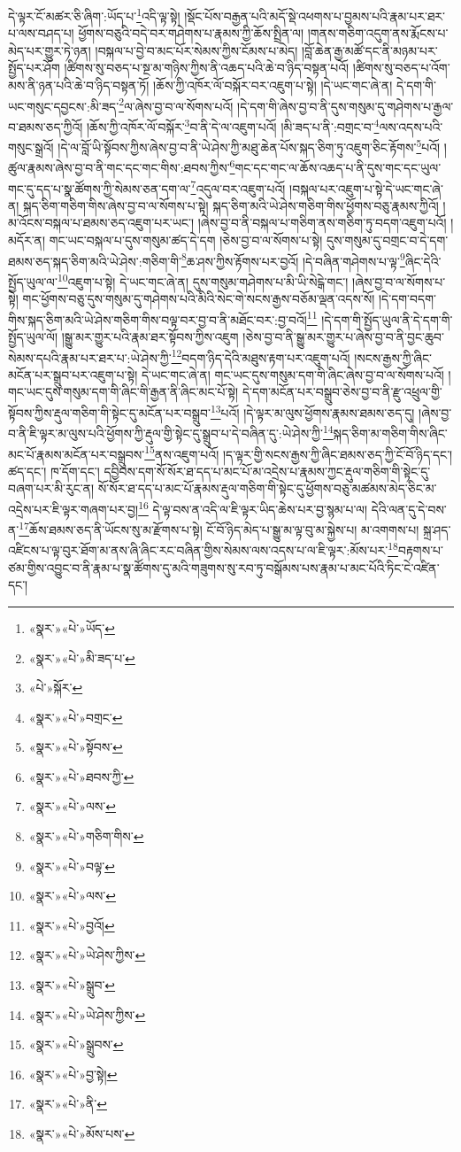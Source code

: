 དེ་ལྟར་ངོ་མཚར་ཅི་ཞིག་:ཡོད་པ་\footnote{«སྣར་»«པེ་»ཡོད་}འདི་ལྟ་སྟེ། །སྡོང་པོས་བརྒྱན་པའི་མདོ་སྡེ་འཕགས་པ་བྱམས་པའི་རྣམ་པར་ཐར་པ་ལས་བཤད་པ། ཕྱོགས་བཅུའི་བདེ་བར་གཤེགས་པ་རྣམས་ཀྱི་ཆོས་སྤྲིན་ལ། །གནས་གཅིག་འདུག་ནས་རྨོངས་པ་མེད་པར་གྱུར་ཏེ་ཉན། །བསྐལ་པ་བྱེ་བ་མང་པོར་སེམས་ཀྱིས་ངོམས་པ་མེད། །བློ་ཆེན་རྒྱ་མཚོ་དང་ནི་མཉམ་པར་སྤྱོད་པར་ཤོག །ཚིགས་སུ་བཅད་པ་སྔ་མ་གཉིས་ཀྱིས་ནི་འཆད་པའི་ཆེ་བ་ཉིད་བསྟན་པའོ། །ཚིགས་སུ་བཅད་པ་འོག་མས་ནི་ཉན་པའི་ཆེ་བ་ཉིད་བསྟན་ཏོ། །ཆོས་ཀྱི་འཁོར་ལོ་བསྐོར་བར་འཇུག་པ་སྟེ། །དེ་ཡང་གང་ཞེ་ན། དེ་དག་གི་ཡང་གསུང་དབྱངས་:མི་ཟད་\footnote{«སྣར་»«པེ་»མི་ཟད་པ་}ལ་ཞེས་བྱ་བ་ལ་སོགས་པའོ། །དེ་དག་གི་ཞེས་བྱ་བ་ནི་དུས་གསུམ་དུ་གཤེགས་པ་རྒྱལ་བ་ཐམས་ཅད་ཀྱིའོ། །ཆོས་ཀྱི་འཁོར་ལོ་བསྐོར་\footnote{«པེ་»སྐོར་}བ་ནི་དེ་ལ་འཇུག་པའོ། །མི་ཟད་པ་ནི་:བགྲང་བ་\footnote{«སྣར་»«པེ་»བགྲང་}ལས་འདས་པའི་གསུང་སྒྲའོ། །དེ་ལ་བློ་ཡི་སྟོབས་ཀྱིས་ཞེས་བྱ་བ་ནི་ཡེ་ཤེས་ཀྱི་མཐུ་ཆེན་པོས་སྐད་ཅིག་ཏུ་འཇུག་ཅིང་རྟོགས་\footnote{«སྣར་»«པེ་»སྟོབས་}པའོ། །ཚུལ་རྣམས་ཞེས་བྱ་བ་ནི་གང་དང་གང་གིས་:ཐབས་ཀྱིས་\footnote{«སྣར་»«པེ་»ཐབས་ཀྱི་}གང་དང་གང་ལ་ཆོས་འཆད་པ་ནི་དུས་གང་དང་ཡུལ་གང་དུ་དད་པ་སྣ་ཚོགས་ཀྱི་སེམས་ཅན་དག་ལ་\footnote{«སྣར་»«པེ་»ལས་}འདུལ་བར་འཇུག་པའོ། །བསྐལ་པར་འཇུག་པ་སྟེ་དེ་ཡང་གང་ཞེ་ན། སྐད་ཅིག་གཅིག་གིས་ཞེས་བྱ་བ་ལ་སོགས་པ་སྟེ། སྐད་ཅིག་མའི་ཡེ་ཤེས་གཅིག་གིས་ཕྱོགས་བཅུ་རྣམས་ཀྱིའོ། །མ་འོངས་བསྐལ་པ་ཐམས་ཅད་འཇུག་པར་ཡང་། །ཞེས་བྱ་བ་ནི་བསྐལ་པ་གཅིག་ནས་གཅིག་ཏུ་བདག་འཇུག་པའོ། །མདོར་ན། གང་ཡང་བསྐལ་པ་དུས་གསུམ་ཚད་དེ་དག །ཅེས་བྱ་བ་ལ་སོགས་པ་སྟེ། དུས་གསུམ་དུ་བགྲང་བ་དེ་དག་ཐམས་ཅད་སྐད་ཅིག་མའི་ཡེ་ཤེས་:གཅིག་གི་\footnote{«སྣར་»«པེ་»གཅིག་གིས་}ཆ་ཤས་ཀྱིས་རྟོགས་པར་བྱའོ། །དེ་བཞིན་གཤེགས་པ་ལྟ་\footnote{«སྣར་»«པེ་»བལྟ་}ཞིང་དེའི་སྤྱོད་ཡུལ་ལ་\footnote{«སྣར་»«པེ་»ལས་}འཇུག་པ་སྟེ། དེ་ཡང་གང་ཞེ་ན། དུས་གསུམ་གཤེགས་པ་མི་ཡི་སེངྒེ་གང་། །ཞེས་བྱ་བ་ལ་སོགས་པ་སྟེ། གང་ཕྱོགས་བཅུ་དུས་གསུམ་དུ་གཤེགས་པའི་མིའི་སེང་གེ་སངས་རྒྱས་བཅོམ་ལྡན་འདས་སོ། །དེ་དག་བདག་གིས་སྐད་ཅིག་མའི་ཡེ་ཤེས་གཅིག་གིས་བལྟ་བར་བྱ་བ་ནི་མཐོང་བར་:བྱ་བའོ།\footnote{«སྣར་»«པེ་»བྱའོ།} །དེ་དག་གི་སྤྱོད་ཡུལ་ནི་དེ་དག་གི་སྤྱོད་ཡུལ་ལོ། །སྒྱུ་མར་གྱུར་པའི་རྣམ་ཐར་སྟོབས་ཀྱིས་འཇུག །ཅེས་བྱ་བ་ནི་སྒྱུ་མར་གྱུར་པ་ཞེས་བྱ་བ་ནི་བྱང་ཆུབ་སེམས་དཔའི་རྣམ་པར་ཐར་པ་:ཡེ་ཤེས་ཀྱི་\footnote{«སྣར་»«པེ་»ཡེ་ཤེས་ཀྱིས་}བདག་ཉིད་དེའི་མཐུས་རྟག་པར་འཇུག་པའོ། །སངས་རྒྱས་ཀྱི་ཞིང་མངོན་པར་སྒྲུབ་པར་འཇུག་པ་སྟེ། དེ་ཡང་གང་ཞེ་ན། གང་ཡང་དུས་གསུམ་དག་གི་ཞིང་ཞེས་བྱ་བ་ལ་སོགས་པའོ། །གང་ཡང་དུས་གསུམ་དག་གི་ཞིང་གི་རྒྱན་ནི་ཞིང་མང་པོ་སྟེ། དེ་དག་མངོན་པར་བསྒྲུབ་ཅེས་བྱ་བ་ནི་རྫུ་འཕྲུལ་གྱི་སྟོབས་ཀྱིས་རྡུལ་གཅིག་གི་སྟེང་དུ་མངོན་པར་བསྒྲུབ་\footnote{«སྣར་»«པེ་»སྒྲུབ་}པའོ། །དེ་ལྟར་མ་ལུས་ཕྱོགས་རྣམས་ཐམས་ཅད་དུ། །ཞེས་བྱ་བ་ནི་ཇི་ལྟར་མ་ལུས་པའི་ཕྱོགས་ཀྱི་རྡུལ་གྱི་སྟེང་དུ་སྒྲུབ་པ་དེ་བཞིན་དུ་:ཡེ་ཤེས་ཀྱི་\footnote{«སྣར་»«པེ་»ཡེ་ཤེས་ཀྱིས་}སྐད་ཅིག་མ་གཅིག་གིས་ཞིང་མང་པོ་རྣམས་མངོན་པར་བསྒྲུབས་\footnote{«སྣར་»«པེ་»སྒྲུབས་}ནས་འཇུག་པའོ། །ད་ལྟར་གྱི་སངས་རྒྱས་ཀྱི་ཞིང་ཐམས་ཅད་ཀྱི་ངོ་བོ་ཉིད་དང་། ཚད་དང་། ཁ་དོག་དང་། དབྱིབས་དག་སོ་སོར་ཐ་དད་པ་མང་པོ་མ་འདྲེས་པ་རྣམས་ཀྱང་རྡུལ་གཅིག་གི་སྟེང་དུ་བཞག་པར་མི་རུང་ན། སོ་སོར་ཐ་དད་པ་མང་པོ་རྣམས་རྡུལ་གཅིག་གི་སྟེང་དུ་ཕྱོགས་བཅུ་མཚམས་མེད་ཅིང་མ་འདྲེས་པར་ཇི་ལྟར་གཞག་པར་བྱ།\footnote{«སྣར་»«པེ་»བྱ་སྟེ།} དེ་ལྟ་བས་ན་འདི་ལ་ཇི་ལྟར་ཡིད་ཆེས་པར་བྱ་སྙམ་པ་ལ། དེའི་ལན་དུ་དེ་བས་ན་\footnote{«སྣར་»«པེ་»ནི་}ཆོས་ཐམས་ཅད་ནི་ཡོངས་སུ་མ་རྫོགས་པ་སྟེ། ངོ་བོ་ཉིད་མེད་པ་སྒྱུ་མ་ལྟ་བུ་མ་སྐྱེས་པ། མ་འགགས་པ། སྐྲ་ཤད་འཛིངས་པ་ལྟ་བུར་ཐོག་མ་ནས་ཞི་ཞིང་རང་བཞིན་གྱིས་སེམས་ལས་འདས་པ་ལ་ཇི་ལྟར་:མོས་པར་\footnote{«སྣར་»«པེ་»མོས་པས་}བརྟགས་པ་ཙམ་གྱིས་འབྱུང་བ་ནི་རྣམ་པ་སྣ་ཚོགས་དུ་མའི་གཟུགས་སུ་རབ་ཏུ་བསྒོམས་པས་རྣམ་པ་མང་པོའི་ཏིང་ངེ་འཛིན་དང་། 